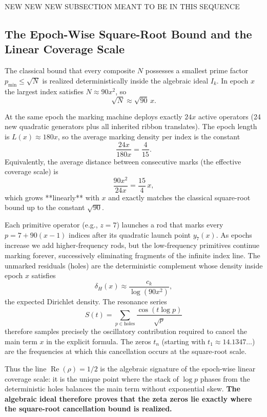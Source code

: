 \documentclass[11pt,a4paper]{article}
\begin{document}
NEW NEW NEW SUBSECTION MEANT TO BE IN THIS SEQUENCE
\subsection{The Epoch-Wise Square-Root Bound and the Linear Coverage Scale}

The classical bound that every composite \(N\) possesses a smallest prime factor \(p_{\min} \leq \sqrt{N}\) is realized deterministically inside the algebraic ideal \(I_k\). In epoch \(x\) the largest index satisfies \(N \approx 90x^2\), so
\[
\sqrt{N} \approx \sqrt{90}\,x.
\]

At the same epoch the marking machine deploys exactly \(24x\) active operators (24 new quadratic generators plus all inherited ribbon translates). The epoch length is \(L(x) \approx 180x\), so the average marking density per index is the constant
\[
\frac{24x}{180x} = \frac{4}{15}.
\]
Equivalently, the average distance between consecutive marks (the effective coverage scale) is
\[
\frac{90x^2}{24x} = \frac{15}{4}\,x,
\]
which grows **linearly** with \(x\) and exactly matches the classical square-root bound up to the constant \(\sqrt{90}\).

Each primitive operator (e.g., \(z=7\)) launches a rod that marks every \(p = 7 + 90(x-1)\) indices after its quadratic launch point \(y_7(x)\). As epochs increase we add higher-frequency rods, but the low-frequency primitives continue marking forever, successively eliminating fragments of the infinite index line. The unmarked residuals (holes) are the deterministic complement whose density inside epoch \(x\) satisfies
\[
\delta_H(x) \approx \frac{c_k}{\log(90x^2)},
\]
the expected Dirichlet density. The resonance series
\[
S(t) = \sum_{p \in \text{holes}} \frac{\cos(t \log p)}{\sqrt{p}}
\]
therefore samples precisely the oscillatory contribution required to cancel the main term \(x\) in the explicit formula. The zeros \(t_n\) (starting with \(t_1 \approx 14.1347\ldots\)) are the frequencies at which this cancellation occurs at the square-root scale.

Thus the line \(\operatorname{Re}(\rho)=1/2\) is the algebraic signature of the epoch-wise linear coverage scale: it is the unique point where the stack of \(\log p\) phases from the deterministic holes balances the main term without exponential skew. \textbf{The algebraic ideal therefore proves that the zeta zeros lie exactly where the square-root cancellation bound is realized.}
\end{document}
